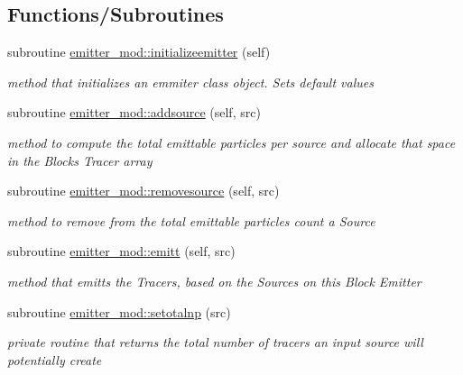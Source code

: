\subsection*{Functions/\+Subroutines}
\begin{DoxyCompactItemize}
\item 
subroutine \mbox{\hyperlink{namespaceemitter__mod_a6376ad0f8e1739b29caf672aa0750373}{emitter\+\_\+mod\+::initializeemitter}} (self)
\begin{DoxyCompactList}\small\item\em method that initializes an emmiter class object. Sets default values \end{DoxyCompactList}\item 
subroutine \mbox{\hyperlink{namespaceemitter__mod_ab704fb0e2eb9b3b4b9542706b6fb4eaf}{emitter\+\_\+mod\+::addsource}} (self, src)
\begin{DoxyCompactList}\small\item\em method to compute the total emittable particles per source and allocate that space in the Blocks Tracer array \end{DoxyCompactList}\item 
subroutine \mbox{\hyperlink{namespaceemitter__mod_a49b704640270da1c4fad50fcd5374376}{emitter\+\_\+mod\+::removesource}} (self, src)
\begin{DoxyCompactList}\small\item\em method to remove from the total emittable particles count a Source \end{DoxyCompactList}\item 
subroutine \mbox{\hyperlink{namespaceemitter__mod_aae156a463b225044bc10f039ede5770d}{emitter\+\_\+mod\+::emitt}} (self, src)
\begin{DoxyCompactList}\small\item\em method that emitts the Tracers, based on the Sources on this Block Emitter \end{DoxyCompactList}\item 
subroutine \mbox{\hyperlink{namespaceemitter__mod_a5c219dd6692a761ad4bf968ae750fcc6}{emitter\+\_\+mod\+::setotalnp}} (src)
\begin{DoxyCompactList}\small\item\em private routine that returns the total number of tracers an input source will potentially create \end{DoxyCompactList}\end{DoxyCompactItemize}
